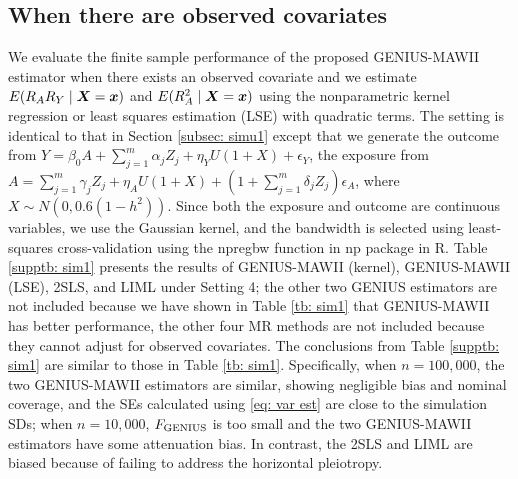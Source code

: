 \documentclass[12pt]{article}
\begin{document}
{\subsection{When there are  observed covariates}
We evaluate the finite sample performance of the proposed GENIUS-MAWII estimator when there exists an observed covariate and we estimate $ E(R_AR_Y\mid \bm{X}=\bm x) $ and $ E(R_A^2\mid \bm{X}=\bm x) $ using the  nonparametric kernel regression or least squares estimation (LSE) with quadratic terms.  The setting is identical to that in Section \ref{subsec: simu1}  except that we generate the outcome from $ Y= \beta_0 A+  \sum_{j=1}^m \alpha_j Z_j + \eta_Y U (1+X) +\epsilon_Y$, the exposure from $ A=   \sum_{j=1}^m  \gamma_j Z_j +  \eta_A U (1+X) + \left(1+ \sum_{j=1}^m \delta_j  Z_j \right) \epsilon_A$, where $ X\sim N(0,0.6(1-h^2))$. Since both the exposure and outcome are continuous variables, we use the Gaussian kernel, and the bandwidth is selected using least-squares cross-validation using the \textsf{npregbw} function in \textsf{np} package in \textsf{R}.
Table \ref{supptb: sim1} presents the results of GENIUS-MAWII (kernel), GENIUS-MAWII (LSE), 2SLS, and LIML under Setting 4; the other two GENIUS estimators are not included because we have shown in Table \ref{tb: sim1} that GENIUS-MAWII has better performance, the  other four MR methods are not included because they cannot adjust for observed covariates. The conclusions from Table \ref{supptb: sim1} are similar to those in Table \ref{tb: sim1}. Specifically, {when $n=100,000$,
	 the two GENIUS-MAWII estimators are similar, showing negligible bias and nominal coverage, and the SEs calculated using \eqref{eq: var est} are close to the simulation SDs; when $n=10,000$, $F_{\rm GENIUS}$ is too small and the two GENIUS-MAWII estimators have some attenuation bias.} In contrast, the 2SLS and LIML are biased because of failing to address the horizontal pleiotropy. 

}
\end{document}
